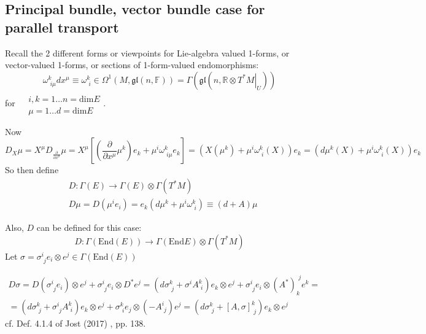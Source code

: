 \documentclass[10pt]{amsart}
\begin{document}
\begin{multicols*}{2}
\subsection{Principal bundle, vector bundle case for parallel transport}  

Recall the 2 different forms or viewpoints for Lie-algebra valued 1-forms, or vector-valued 1-forms, or sections of 1-form-valued endomorphisms:
\[
\omega^k_{ \,\, i\mu} dx^{\mu} \equiv \omega^k_{\,\,i} \in \Omega^1(M,\mathfrak{gl}(n,\mathbb{F})) = \Gamma(\mathfrak{gl}(n,\mathbb{R} \otimes \left. T^* M \right|_U ) )
\] 
for $\begin{aligned} & \quad \\
	& i,k = 1\dots n =\text{dim}E \\ 
	& \mu = 1\dots d =\text{dim}E \end{aligned}$.  

Now
\[
D_X\mu = X^{\mu} D_{\frac{\partial }{ \partial x^{\mu}}}\mu = X^{\mu} \left[ \left( \frac{ \partial }{ \partial x^{\mu}} \mu^k \right) e_k + \mu^i \omega^k_{ \,\, i\mu} e_k \right] = \left( X(\mu^k) + \mu^i \omega^k_{ \,\, i}(X) \right) e_k = \left( d\mu^k(X) + \mu^i \omega^k_{ \,\, i}(X) \right) e_k
\]
So then define 
\begin{equation}
	\begin{aligned}
		& D: \Gamma(E) \to \Gamma(E) \otimes \Gamma(T^*M) \\
	& D\mu  = D(\mu^i e_i) = e_k ( d\mu^k +\mu^i \omega^k_{ \,\, i}) \equiv (d+A)\mu
	\end{aligned}
\end{equation}

Also, $D$ can be defined for this case:
\[
D: \Gamma (\text{End}(E)) \to \Gamma(\text{End}E) \otimes \Gamma(T^*M)
\]
Let $\sigma = \sigma^i_{ \,\, j} e_i \otimes e^j \in \Gamma(\text{End}(E))$

\begin{equation}
\begin{gathered}
	D\sigma = D(\sigma^i_{ \,\, j} e_i ) \otimes e^j + \sigma^i_{ \,\, j} e_i \otimes D^* e^j = \left( d\sigma^k_{ \,\, j} + \sigma^i A^k_{ \,\, i} \right) e_k \otimes e^j + \sigma^i_{ \,\, j} e_i \otimes (A^*)_k^{ \,\, j} e^k = \\
	= (d\sigma^k_{ \,\, j} + \sigma^i_{ \,\, j} A^k_{ \,\, i} ) e_k \otimes e^j + \sigma^k_{ \,\, i} e_j \otimes (- A^i_{ \, \, j}) e^j = (d\sigma^k_{ \,\, j} + [A,\sigma]^k_{ \,\, j}) e_k\otimes e^j
\end{gathered}
\end{equation}
cf. Def. 4.1.4 of Jost (2017) \cite{Jost2017}, pp. 138.  


\end{multicols*}
\end{document}
